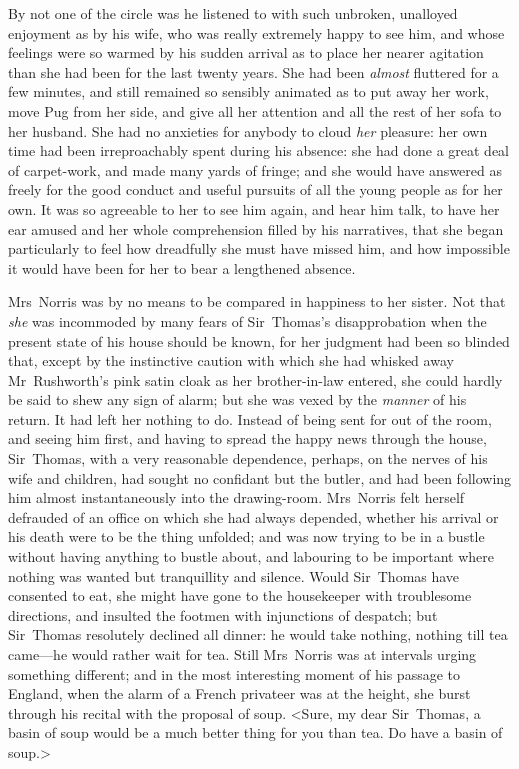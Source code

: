 By not one of the circle was he listened to with such unbroken, unalloyed enjoyment as by his wife, who was really extremely happy to see him, and whose feelings were so warmed by his sudden arrival as to place her nearer agitation than she had been for the last twenty years. She had been \textit{almost}  fluttered for a few minutes, and still remained so sensibly animated as to put away her work, move Pug from her side, and give all her attention and all the rest of her sofa to her husband. She had no anxieties for anybody to cloud \textit{her}  pleasure: her own time had been irreproachably spent during his absence: she had done a great deal of carpet-work, and made many yards of fringe; and she would have answered as freely for the good conduct and useful pursuits of all the young people as for her own. It was so agreeable to her to see him again, and hear him talk, to have her ear amused and her whole comprehension filled by his narratives, that she began particularly to feel how dreadfully she must have missed him, and how impossible it would have been for her to bear a lengthened absence.

Mrs~Norris was by no means to be compared in happiness to her sister. Not that \textit{she}  was incommoded by many fears of Sir~Thomas's disapprobation when the present state of his house should be known, for her judgment had been so blinded that, except by the instinctive caution with which she had whisked away Mr~Rushworth's pink satin cloak as her brother-in-law entered, she could hardly be said to shew any sign of alarm; but she was vexed by the \textit{manner}  of his return. It had left her nothing to do. Instead of being sent for out of the room, and seeing him first, and having to spread the happy news through the house, Sir~Thomas, with a very reasonable dependence, perhaps, on the nerves of his wife and children, had sought no confidant but the butler, and had been following him almost instantaneously into the drawing-room. Mrs~Norris felt herself defrauded of an office on which she had always depended, whether his arrival or his death were to be the thing unfolded; and was now trying to be in a bustle without having anything to bustle about, and labouring to be important where nothing was wanted but tranquillity and silence. Would Sir~Thomas have consented to eat, she might have gone to the housekeeper with troublesome directions, and insulted the footmen with injunctions of despatch; but Sir~Thomas resolutely declined all dinner: he would take nothing, nothing till tea came—he would rather wait for tea. Still Mrs~Norris was at intervals urging something different; and in the most interesting moment of his passage to England, when the alarm of a French privateer was at the height, she burst through his recital with the proposal of soup. <Sure, my dear Sir~Thomas, a basin of soup would be a much better thing for you than tea. Do have a basin of soup.>

